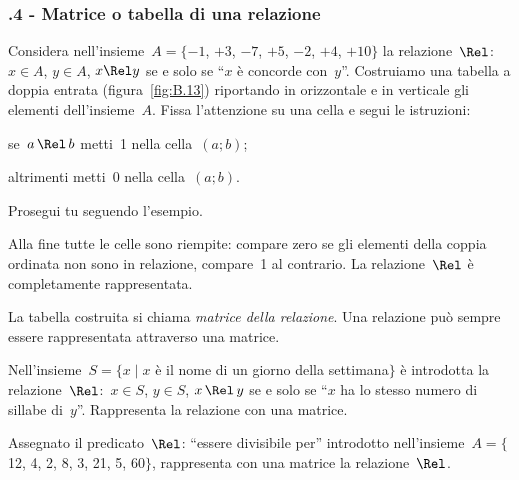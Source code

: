 \begin{multicols}{2}
 \subsubsection*{\thechapter.4 - Matrice o tabella di una relazione}

\begin{esercizio}
\label{ese:B.9}
Considera nell'insieme~$A = \{-1$, $+3$, $-7$, $+5$, $-2$, $+4$, $+10\}$ la relazione~$\Rel$:~$x \in A$, $y \in A$, $x \Rel y$ se e solo se ``$x$
è concorde con~$y$''. Costruiamo una tabella a doppia entrata (figura~\ref{fig:B.13}) riportando in orizzontale e in verticale gli elementi dell'insieme~$A$.
Fissa l'attenzione su una cella e segui le istruzioni:
\begin{itemize*}
\item se~$a \,\Rel\, b$ metti~1 nella cella~$(a;b)$;
\item altrimenti metti~0 nella cella~$(a;b)$.
\end{itemize*}
Prosegui tu seguendo l'esempio.
\end{esercizio}

\osservazione Alla fine tutte le celle sono riempite: compare zero se gli elementi della coppia ordinata non sono in relazione, compare~1 al contrario.
La relazione~$\Rel$ è completamente rappresentata.

La tabella costruita si chiama \emph{matrice della relazione}.
Una relazione può sempre essere rappresentata attraverso una matrice.

\begin{esercizio}
\label{ese:B.10}
Nell'insieme~$S = \{ x \mid  x$ è il nome di un giorno della settimana$\}$ è introdotta la relazione~$\Rel$:~$x \in S$, $y \in S$, $x \,\Rel\, y$
se e solo se ``$x$ ha lo stesso numero di sillabe di~$y$''. Rappresenta la relazione con una matrice.
\end{esercizio}

\begin{esercizio}
\label{ese:B.11}
Assegnato il predicato~$\Rel$: ``essere divisibile per'' introdotto nell'insieme~$A =\{$12, 4, 2, 8, 3, 21, 5, 60$\}$, rappresenta con una matrice la relazione~$\Rel$.
\end{esercizio}

\end{multicols}

